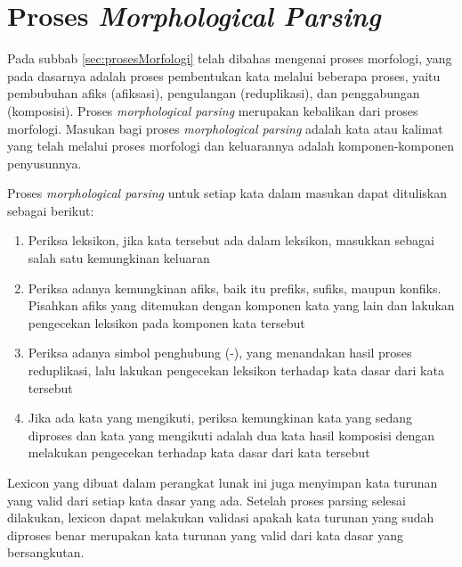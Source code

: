 \section{Proses \textit{Morphological Parsing}}
\label{sec:morphologicalParsing}

Pada subbab \ref{sec:prosesMorfologi} telah dibahas mengenai proses morfologi, yang pada dasarnya adalah proses pembentukan kata melalui beberapa proses, yaitu pembubuhan afiks (afiksasi), pengulangan (reduplikasi), dan penggabungan (komposisi). Proses \textit{morphological parsing} merupakan kebalikan dari proses morfologi. Masukan bagi proses \textit{morphological parsing} adalah kata atau kalimat yang telah melalui proses morfologi dan keluarannya adalah komponen-komponen penyusunnya.

Proses \textit{morphological parsing} untuk setiap kata dalam masukan dapat dituliskan sebagai berikut:
\begin{enumerate}
	\item Periksa leksikon, jika kata tersebut ada dalam leksikon, masukkan sebagai salah satu kemungkinan keluaran
	\item Periksa adanya kemungkinan afiks, baik itu prefiks, sufiks, maupun konfiks. Pisahkan afiks yang ditemukan dengan komponen kata yang lain dan lakukan pengecekan leksikon pada komponen kata tersebut
	\item Periksa adanya simbol penghubung (-), yang menandakan hasil proses reduplikasi, lalu lakukan pengecekan leksikon terhadap kata dasar dari kata tersebut
	\item Jika ada kata yang mengikuti, periksa kemungkinan kata yang sedang diproses dan kata yang mengikuti adalah dua kata hasil komposisi dengan melakukan pengecekan terhadap kata dasar dari kata tersebut
\end{enumerate}

Lexicon yang dibuat dalam perangkat lunak ini juga menyimpan kata turunan yang valid dari setiap kata dasar yang ada. Setelah proses parsing selesai dilakukan, lexicon dapat melakukan validasi apakah kata turunan yang sudah diproses benar merupakan kata turunan yang valid dari kata dasar yang bersangkutan. 

